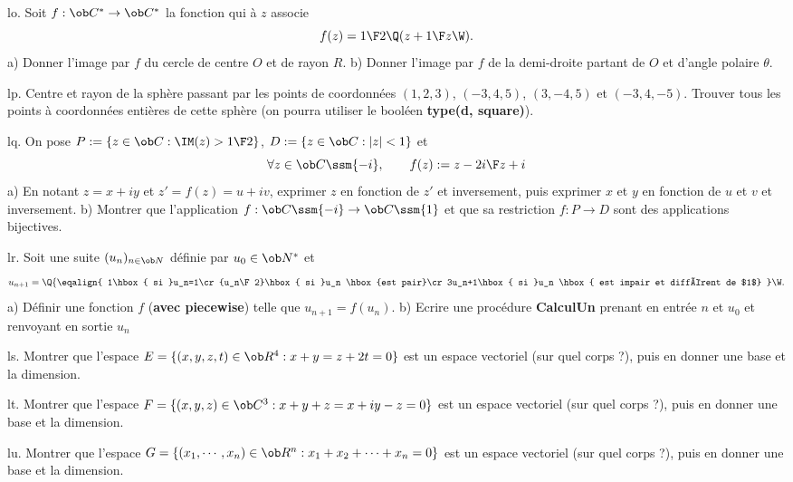 \exo [Level=1,Fight=0,Learn=1,Field=\NombresComplexes,Type=\Exercices,Origin=] lo. 
Soit $f:\ob C^*\to\ob C^*$ la fonction qui à $z$ associe
$$
f(z)={1\F2}\Q(z+{1\F z}\W).
$$
a) Donner l'image par $f$ du cercle de centre $O$ et de rayon $R$. \pn
b) Donner l'image par $f$ de la demi-droite partant de $O$ et d'angle polaire $\theta$. 

\exo [Level=1,Fight=0,Learn=1,Field=\NombresComplexes,Type=\Maple,Origin=] lp. 
Centre et rayon de la sphère passant par les points de coordonnées $(1,2,3)$, $(-3,4,5)$, $(3,-4,5)$ et $(-3,4,-5)$. Trouver tous les points à coordonnées entières de cette sphère (on pourra utiliser le booléen {\bf type(d, square)}). 


\exo [Level=1,Fight=0,Learn=1,Field=\NombresComplexes,Type=\Exercices,Origin=] lq. 
On pose $P:=\{z\in\ob C:\IM(z)>{1\F 2}\}$,  $D:=\{z\in\ob C:|z|<1\}$ et 
$$
\forall z\in\ob C\ssm\{-i\}, \qquad f(z):={z-2i\F z+i}
$$
a) En notant $z=x+iy$ et $z'=f(z)=u+iv$, exprimer $z$ en fonction de $z'$ et inversement, puis exprimer $x$ et $y$ en fonction de $u$ et $v$ et inversement. 
\medskip\noindent
b)  Montrer que l'application $f:\ob C\ssm\{-i\}\to\ob C\ssm\{1\}$ et que sa restriction $f:P\to D$ sont des applications bijectives. 

\exo [Level=1,Fight=0,Learn=1,Field=\Suites,Type=\Exercices,Origin=\Maple] lr. 
Soit une suite $(u_n)_{n\in\ob N}$ définie par $u_0\in\ob N^*$ et 
$$
u_{n+1}=\Q\{
\eqalign{
1\hbox{ si }u_n=1\cr
{u_n\F2}\hbox{ si }u_n \hbox{est pair}\cr
3u_n+1\hbox{ si }u_n \hbox{ est impair et différent de $1$}
}
\W.
$$
a) Définir une fonction $f$ ({\bf avec piecewise}) telle que $u_{n+1}=f(u_n)$. \pn
b) Ecrire une procédure {\bf CalculUn} prenant en entrée $n$ et $u_0$ et renvoyant en sortie $u_n$

\exo [Level=1,Fight=0,Learn=0,Field=\DimensionFinie,Type=\Exercices,Origin=] ls. 
Montrer que l'espace $E=\{(x,y,z,t)\in\ob R^4:x+y=z+2t=0\}$ est un espace vectoriel (sur quel corps ?), puis en donner une base et la dimension. 

\exo  [Level=1,Fight=0,Learn=0,Field=\DimensionFinie,Type=\Exercices,Origin=] lt. 
Montrer que l'espace $F=\{(x,y,z)\in\ob C^3:x+y+z=x+iy-z=0\}$ est un espace vectoriel (sur quel corps ?), puis en donner une base et la dimension. 

\exo  [Level=1,Fight=0,Learn=0,Field=\DimensionFinie,Type=\Exercices,Origin=] lu. 
Montrer que l'espace $G=\{(x_1,\cdots,x_n)\in\ob R^n:x_1+x_2+\cdots+x_n=0\}$ est un espace vectoriel (sur quel corps ?), puis en donner une base et la dimension. 

